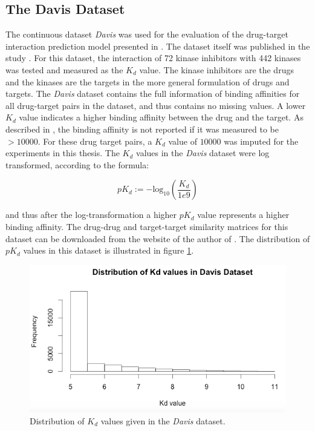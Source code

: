\subsection{The Davis Dataset}

The continuous dataset \textit{Davis} was used for the evaluation of the drug-target interaction prediction model presented in \cite{pahikkala2014toward}. The dataset itself was published in the study \cite{davis2011comprehensive}. For this dataset, the interaction of 72 kinase inhibitors with 442 kinases was tested and measured as the $K_d$ value. The kinase inhibitors are the drugs and the kinases are the targets in the more general formulation of drugs and targets. The \textit{Davis} dataset contains the full information of binding affinities for all drug-target pairs in the dataset, and thus contains no missing values. A lower $K_d$ value indicates a higher binding affinity between the drug and the target. As described in \cite{davis2011comprehensive}, the binding affinity is not reported if it was measured to be $>10000$. For these drug target pairs, a $K_d$ value of $10000$ was imputed for the experiments in this thesis.
The $K_d$ values in the \textit{Davis} dataset were log transformed, according to the formula:

\begin{equation}
pK_d:= -\text{log}_{10}(\frac{K_d}{1e9})
\end{equation}

and thus after the log-transformation a higher $pK_d$ value represents a higher binding affinity. The drug-drug and target-target similarity matrices for this dataset can be downloaded from the website of the author of \cite{pahikkala2014toward}. The distribution of $pK_d$ values in this dataset is illustrated in figure \ref{fig:davis_dist}.

\begin{figure}
\begin{center}
\includegraphics[scale=0.6]{davis_dist.png}
\end{center}
\caption{Distribution of $K_d$ values given in the \textit{Davis} dataset.}
\label{fig:davis_dist}
\end{figure}

